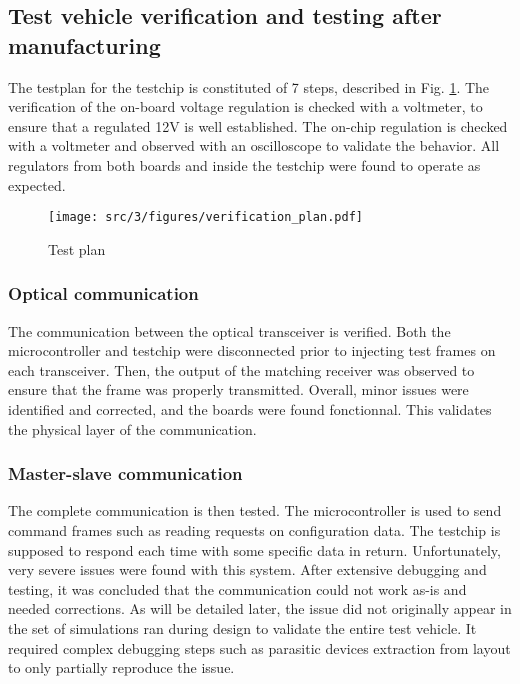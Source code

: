 \subsection{Test vehicle verification and testing after manufacturing}
\label{sec:test-vehicle-testing}

The testplan for the testchip is constituted of 7 steps, described in Fig. \ref{fig:verif-plan}.
The verification of the on-board voltage regulation is checked with a voltmeter, to ensure that a regulated 12V is well established.
The on-chip regulation is checked with a voltmeter and observed with an oscilloscope to validate the behavior.
All regulators from both boards and inside the testchip were found to operate as expected.

\begin{figure}[!h]
  \centering
  \texttt{[image: src/3/figures/verification\_plan.pdf]}
  \caption{Test plan}
  \label{fig:verif-plan}
\end{figure}


\subsubsection{Optical communication}

The communication between the optical transceiver is verified.
Both the microcontroller and testchip were disconnected prior to injecting test frames on each transceiver.
Then, the output of the matching receiver was observed to ensure that the frame was properly transmitted.
Overall, minor issues were identified and corrected, and the boards were found fonctionnal.
This validates the physical layer of the communication.

\subsubsection{Master-slave communication}

The complete communication is then tested.
The microcontroller is used to send command frames such as reading requests on configuration data.
The testchip is supposed to respond each time with some specific data in return.
Unfortunately, very severe issues were found with this system.
After extensive debugging and testing, it was concluded that the communication could not work as-is and needed corrections.
As will be detailed later, the issue did not originally appear in the set of simulations ran during design to validate the entire test vehicle.
It required complex debugging steps such as parasitic devices extraction from layout to only partially reproduce the issue.


